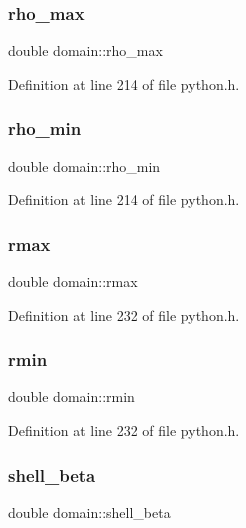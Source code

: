 \subsubsection{\texorpdfstring{rho\+\_\+max}{rho\_max}}
{\footnotesize\ttfamily double domain\+::rho\+\_\+max}



Definition at line 214 of file python.\+h.

\mbox{\label{structdomain_aa1a157a923d525e54bce851e96f8a19c}} 
\subsubsection{\texorpdfstring{rho\+\_\+min}{rho\_min}}
{\footnotesize\ttfamily double domain\+::rho\+\_\+min}



Definition at line 214 of file python.\+h.

\mbox{\label{structdomain_ac9d475ec0bfd21ae12dae1b6c05d030d}} 
\subsubsection{\texorpdfstring{rmax}{rmax}}
{\footnotesize\ttfamily double domain\+::rmax}



Definition at line 232 of file python.\+h.

\mbox{\label{structdomain_ae007f791a45e90db42de91c27654ed09}} 
\subsubsection{\texorpdfstring{rmin}{rmin}}
{\footnotesize\ttfamily double domain\+::rmin}



Definition at line 232 of file python.\+h.

\mbox{\label{structdomain_a678c4aca9df82bcd2bdbba9a111e2683}} 
\subsubsection{\texorpdfstring{shell\+\_\+beta}{shell\_beta}}
{\footnotesize\ttfamily double domain\+::shell\+\_\+beta}



